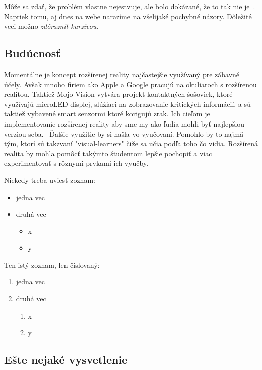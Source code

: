 \documentclass[10pt,twoside,slovak,a4paper]{article}
\begin{document}
Môže sa zdať, že problém vlastne nejestvuje\cite{}, ale bolo dokázané, že to tak nie je~\cite{}. Napriek tomu, aj dnes na webe narazíme na všelijaké pochybné názory\cite{}. Dôležité veci možno \emph{zdôrazniť kurzívou}.


\subsection{Budúcnosť} \label{4:2}

Momentálne je koncept rozšírenej reality najčastejšie využívaný pre zábavné účely. Avšak mnoho firiem ako Apple a Google pracujú na okuliaroch s rozšírenou realitou. Taktiež Mojo Vision vytvára projekt kontaktných šošoviek, ktoré využívajú microLED displej, slúžiaci na zobrazovanie kritických informácií, a sú taktiež vybavené smart senzormi ktoré korigujú zrak. Ich cieľom je implementovanie rozšírenej reality aby sme my ako ľudia mohli byť najlepšiou verziou seba.~\cite{Mojo} Ďalšie využitie by si našla vo vyučovaní. Pomohlo by to najmä tým, ktorí sú takzvaní "visual-learners" čiže sa učia podľa toho čo vidia. Rozšírená realita by mohla pomôcť takýmto študentom lepšie pochopiť a viac experimentovať s rôznymi prvkami ich vyučby.


Niekedy treba uviesť zoznam:

\begin{itemize}
\item jedna vec
\item druhá vec
	\begin{itemize}
	\item x
	\item y
	\end{itemize}
\end{itemize}

Ten istý zoznam, len číslovaný:

\begin{enumerate}
\item jedna vec
\item druhá vec
	\begin{enumerate}
	\item x
	\item y
	\end{enumerate}
\end{enumerate}


\subsection{Ešte nejaké vysvetlenie} \label{ina:este}
\end{document}
